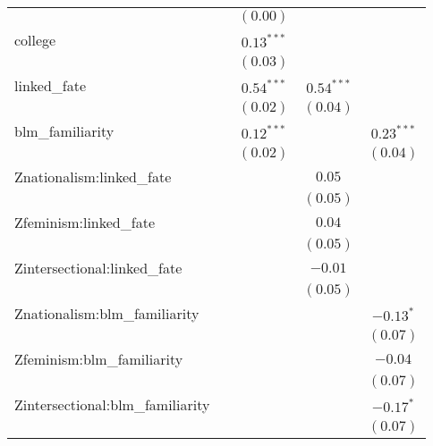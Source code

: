 \documentclass[
]{article}
\begin{document}
\begin{table}
\begin{center}
\begin{tabular}{l c c c c}
                                 &              & $(0.00)$      &              &              \\
college                          &              & $0.13^{***}$  &              &              \\
                                 &              & $(0.03)$      &              &              \\
linked\_fate                     &              & $0.54^{***}$  & $0.54^{***}$ &              \\
                                 &              & $(0.02)$      & $(0.04)$     &              \\
blm\_familiarity                 &              & $0.12^{***}$  &              & $0.23^{***}$ \\
                                 &              & $(0.02)$      &              & $(0.04)$     \\
Znationalism:linked\_fate        &              &               & $0.05$       &              \\
                                 &              &               & $(0.05)$     &              \\
Zfeminism:linked\_fate           &              &               & $0.04$       &              \\
                                 &              &               & $(0.05)$     &              \\
Zintersectional:linked\_fate     &              &               & $-0.01$      &              \\
                                 &              &               & $(0.05)$     &              \\
Znationalism:blm\_familiarity    &              &               &              & $-0.13^{*}$  \\
                                 &              &               &              & $(0.07)$     \\
Zfeminism:blm\_familiarity       &              &               &              & $-0.04$      \\
                                 &              &               &              & $(0.07)$     \\
Zintersectional:blm\_familiarity &              &               &              & $-0.17^{*}$  \\
                                 &              &               &              & $(0.07)$     \\

\end{tabular}
\end{center}
\end{table}
\end{document}

